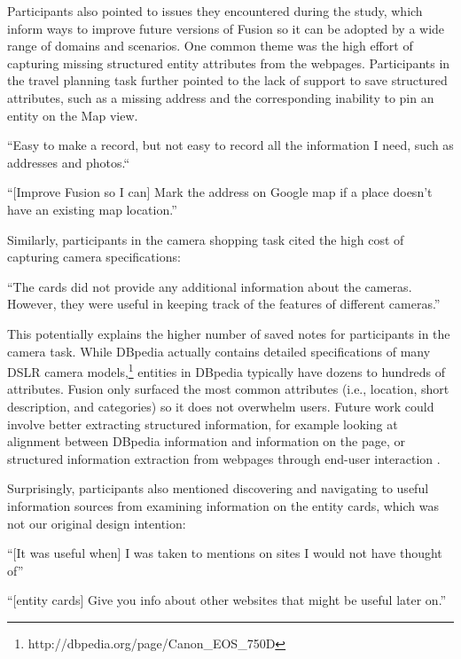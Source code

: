 Participants also pointed to issues they encountered during the study, which inform ways to improve future versions of Fusion so it can be adopted by a wide range of domains and scenarios.
One common theme was the high effort of capturing missing structured entity attributes from the webpages. Participants in the travel planning task further pointed to the lack of support to save structured attributes, such as a missing address and the corresponding inability to pin an entity on the Map view. 

\begin{tightquote}
``Easy to make a record, but not easy to record all the information I need, such as addresses and photos.``

``[Improve Fusion so I can] Mark the address on Google map if a place doesn't have an existing map location.'' 
\end{tightquote}

\noindent Similarly, participants in the camera shopping task cited the high cost of capturing camera specifications:

\begin{tightquote}
``The cards did not provide any additional information about the cameras. However, they were useful in keeping track of the features of different cameras.''
\end{tightquote}

\noindent This potentially explains the higher number of saved notes for participants in the camera task. While DBpedia actually contains detailed specifications of many DSLR camera models,\footnote{http://dbpedia.org/page/Canon\_EOS\_750D} entities in DBpedia typically have dozens to hundreds of attributes. Fusion only surfaced the most common attributes (i.e., location, short description, and categories) so it does not overwhelm users. Future work could involve better extracting structured information, for example looking at alignment between DBpedia information and information on the page, or structured information extraction from webpages through end-user interaction \cite{thresher,bier2006entity}.


\noindent Surprisingly, participants also mentioned discovering and navigating to useful information sources from examining information on the entity cards, which was not our original design intention:

\begin{tightquote}
``[It was useful when] I was taken to mentions on sites I would not have thought of''

``[entity cards] Give you info about other websites that might be useful later on.''
\end{tightquote}


